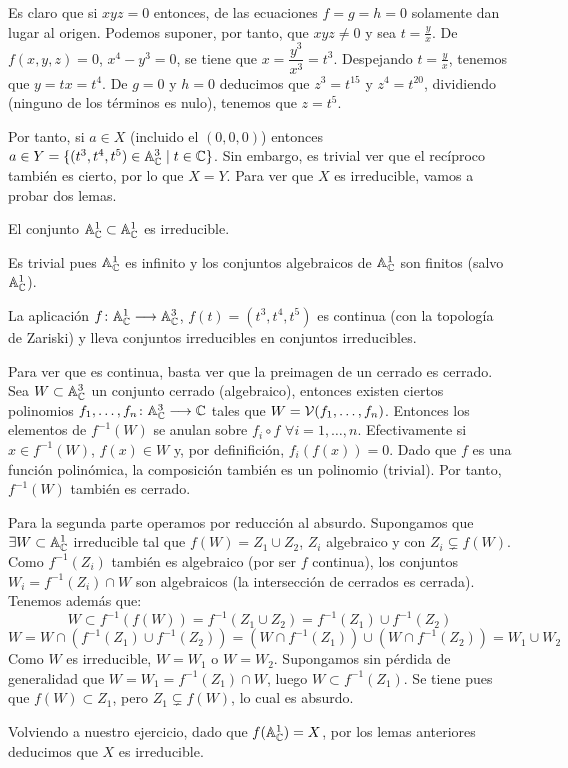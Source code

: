 \documentclass[twoside]{article}
\begin{document}
\begin{ejercicio}{6}
\begin{solucion}
\begin{enumerate}
Es claro que si $xyz = 0$ entonces, de las ecuaciones $f=g=h=0$ solamente dan lugar al origen. Podemos suponer, por tanto, que $xyz\neq 0$ y sea $t=\frac{y}{x}$. De $f(x,y,z)=0$, $x^4-y^3=0$, se tiene que $x=\dfrac{y^3}{x^3}=t^3$. Despejando $t=\frac{y}{x}$, tenemos que $y= tx = t^4$. De $g=0$ y $h=0$ deducimos que $z^3 = t^{15}$ y $z^4 = t^{20}$, dividiendo (ninguno de los términos es nulo), tenemos que $z=t^5$. 

Por tanto, si $a\in X$ (incluido el $(0,0,0)$) entonces $a\in Y=\{(t^3,t^4,t^5)\in\mathbb{A}^3_{\mathbb{C}}\mid t\in \mathbb{C}\}$. Sin embargo, es trivial ver que el recíproco también es cierto, por lo que $X=Y$. Para ver que $X$ es irreducible, vamos a probar dos lemas.

\begin{lemma}
El conjunto $\mathbb{A}^1_{\mathbb{C}}\subset \mathbb{A}^1_{\mathbb{C}}$ es irreducible.
\end{lemma}
\begin{dem}
Es trivial pues $\mathbb{A}^1_{\mathbb{C}}$ es infinito y los conjuntos algebraicos de $\mathbb{A}^1_{\mathbb{C}}$ son finitos (salvo $\mathbb{A}^1_{\mathbb{C}}$).
\end{dem}

\begin{lemma}
La aplicación $f\colon{\mathbb{A}^1_{\mathbb{C}}}\longrightarrow{\mathbb{A}^3_{\mathbb{C}}}$, $f(t)=(t^3,t^4,t^5)$ es continua (con la topología de Zariski) y lleva conjuntos irreducibles en conjuntos irreducibles.
\end{lemma}
\begin{dem}
Para ver que es continua, basta ver que la preimagen de un cerrado es cerrado. Sea $W \subset \mathbb{A}^3_{\mathbb{C}}$ un conjunto cerrado (algebraico), entonces existen ciertos polinomios $f_1,\dotsc,f_n\colon{\mathbb{A}^3_{\mathbb{C}}}\longrightarrow{\mathbb{C}}$ tales que $W=\mathcal{V}(f_1,\dotsc,f_n)$. Entonces los elementos de $f^{-1}(W)$ se anulan sobre $f_i \circ f$ $\forall i=1,\dotsc,n$. Efectivamente si $x\in f^{-1}(W)$, $f(x)\in W$ y, por definifición, $f_i(f(x)) = 0$. Dado que $f$ es una función polinómica, la composición también es un polinomio (trivial). Por tanto, $f^{-1}(W)$ también es cerrado.

Para la segunda parte operamos por reducción al absurdo. Supongamos que ${\exists W \subset \mathbb{A}^1_{\mathbb{C}}}$ irreducible tal que $f(W)=Z_1 \cup Z_2$, $Z_i$ algebraico y con $Z_i\subsetneq f(W)$. Como $f^{-1}(Z_i)$ también es algebraico (por ser $f$ continua), los conjuntos ${W_i = f^{-1}(Z_i)\cap W}$ son algebraicos (la intersección de cerrados es cerrada). Tenemos además que:
$$ W \subset f^{-1}(f(W)) = f^{-1}(Z_1\cup Z_2) = f^{-1}(Z_1)\cup f^{-1}(Z_2)$$
$$
W = W\cap (f^{-1}(Z_1)\cup f^{-1}(Z_2)) = (W\cap f^{-1}(Z_1))\cup(W \cap f^{-1}(Z_2)) = W_1 \cup W_2
$$
Como $W$ es irreducible, $W=W_1$ o $W=W_2$. Supongamos sin pérdida de generalidad que $W=W_1= f^{-1}(Z_1)\cap W$, luego $W \subset f^{-1}(Z_1)$. Se tiene pues que $f(W)\subset Z_1$, pero $Z_1 \subsetneq f(W)$, lo cual es absurdo.
\end{dem}
Volviendo a nuestro ejercicio, dado que $f(\mathbb{A}^1_{\mathbb{C}}) = X$, por los lemas anteriores deducimos que $X$ es irreducible.


\end{enumerate}
\end{solucion}
\end{ejercicio}
\end{document}
